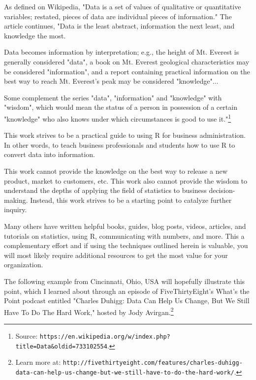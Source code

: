 %
%
%
%
%

As defined on Wikipedia, "Data is a set of values of qualitative or quantitative variables; restated, pieces of data are individual pieces of information." The article continues, "Data is the least abstract, information the next least, and knowledge the most.

Data becomes information by interpretation; e.g., the height of Mt. Everest is generally considered "data", a book on Mt. Everest geological characteristics may be considered "information", and a report containing practical information on the best way to reach Mt. Everest's peak may be considered "knowledge"...

Some complement the series "data", "information" and "knowledge" with "wisdom", which would mean the status of a person in possession of a certain "knowledge" who also knows under which circumstances is good to use it."\footnote{Source: \texttt{https://en.wikipedia.org/w/index.php?title=Data&oldid=733102554}.}

This work strives to be a practical guide to using R for business 
administration. In other words, to teach business professionals and students how to use R to convert data into information.

This work cannot provide the knowledge on the best way to release a new product, market to customers, etc. This work also cannot provide the wisdom to understand the depths of applying the field of statistics to business decision-making. Instead, this work strives to be a starting point to catalyze further inquiry.

Many others have written helpful books, guides, blog posts, videos, articles, and tutorials on statistics, using R, communicating with numbers, and more. This a complementary effort and if using the techniques outlined herein is valuable, you will most likely require additional resources to get the most value for your organization.

The following example from Cincinnati, Ohio, USA will hopefully illustrate this point, which I learned about through an episode of FiveThirtyEight's What's the Point podcast entitled "Charles Duhigg: Data Can Help Us Change, But We Still Have To Do The Hard Work," hosted by Jody Avirgan.\footnote{Learn more at: \texttt{http://fivethirtyeight.com/features/charles-duhigg-data-can-help-us-change-but-we-still-have-to-do-the-hard-work/}.} 


